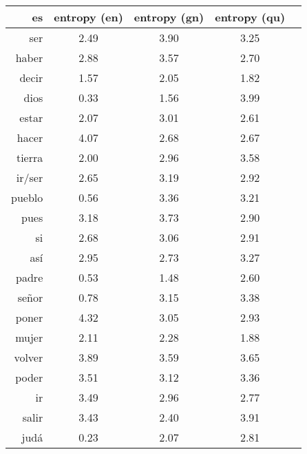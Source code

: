 \begin{figure*}
  \begin{tiny}
  \begin{centering}
  \begin{tabular}{|r|c|c|c|c|}
    \hline
    es & entropy (en) & entropy (gn) & entropy (qu) \\
    \hline
ser    &     2.49         &      3.90        &       3.25       \\  
haber  &     2.88         &      3.57        &       2.70       \\
decir  &     1.57         &      2.05        &       1.82       \\
dios   &     0.33         &      1.56        &       3.99       \\
estar  &     2.07         &      3.01        &       2.61       \\
hacer  &     4.07         &      2.68        &       2.67       \\
tierra &     2.00         &      2.96        &       3.58       \\
ir/ser &     2.65         &      3.19        &       2.92       \\
pueblo &     0.56         &      3.36        &       3.21       \\
pues   &     3.18         &      3.73        &       2.90       \\
si     &     2.68         &      3.06        &       2.91       \\
así    &     2.95         &      2.73        &       3.27       \\
padre  &     0.53         &      1.48        &       2.60       \\
señor  &     0.78         &      3.15        &       3.38       \\
poner  &     4.32         &      3.05        &       2.93       \\
mujer  &     2.11         &      2.28        &       1.88       \\
volver &     3.89         &      3.59        &       3.65       \\
poder  &     3.51         &      3.12        &       3.36       \\
ir     &     3.49         &      2.96        &       2.77       \\
salir  &     3.43         &      2.40        &       3.91       \\
judá   &     0.23         &      2.07        &       2.81       \\

\end{tabular}
\end{centering}
\end{tiny}
\end{figure*}

